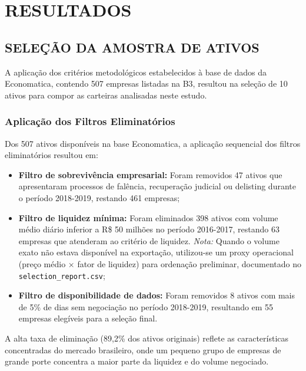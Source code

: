 
\chapter{RESULTADOS}

\section{SELEÇÃO DA AMOSTRA DE ATIVOS}

A aplicação dos critérios metodológicos estabelecidos à base de dados da Economatica, contendo 507 empresas listadas na B3, resultou na seleção de 10 ativos para compor as carteiras analisadas neste estudo.

\subsection{Aplicação dos Filtros Eliminatórios}

Dos 507 ativos disponíveis na base Economatica, a aplicação sequencial dos filtros eliminatórios resultou em:

\begin{itemize}
    \item \textbf{Filtro de sobrevivência empresarial:} Foram removidos 47 ativos que apresentaram processos de falência, recuperação judicial ou delisting durante o período 2018-2019, restando 461 empresas;
    
    \item \textbf{Filtro de liquidez mínima:} Foram eliminados 398 ativos com volume médio diário inferior a R\$ 50 milhões no período 2016-2017, restando 63 empresas que atenderam ao critério de liquidez. \textit{Nota:} Quando o volume exato não estava disponível na exportação, utilizou-se um proxy operacional (preço médio × fator de liquidez) para ordenação preliminar, documentado no \texttt{selection\_report.csv};
    
    \item \textbf{Filtro de disponibilidade de dados:} Foram removidos 8 ativos com mais de 5\% de dias sem negociação no período 2018-2019, resultando em 55 empresas elegíveis para a seleção final.
\end{itemize}

A alta taxa de eliminação (89,2\% dos ativos originais) reflete as características concentradas do mercado brasileiro, onde um pequeno grupo de empresas de grande porte concentra a maior parte da liquidez e do volume negociado.

